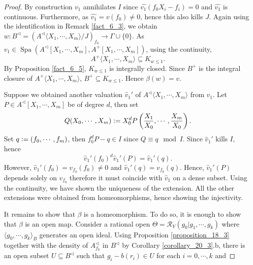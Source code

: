 \documentclass[10pt]{article}
\numberwithin{equation}{section}
\theoremstyle{definition}
\DeclareMathOperator{\Spa}{Spa}
\newcommand{\defeq}{\vcentcolon=}
\newcommand{\cR}[0]{\mathcal{R}}
\begin{document}
\begin{proof}
By construction $\widehat{v_1}$ annihilates $I$ since $\widehat{v_1}(f_0X_i-f_i) = 0$ and $\widehat{v_1}$ is continuous.
Furthermore, as $\widehat{v_1} = v(f_0) \not = 0$, hence this also kills $J$. Again using the identification in Remark \ref{fact_6_3}, we obtain $w:B^\triangleleft = (A^\triangleleft\langle X_1,\cdots,X_m\rangle/J)_{f_0}\to\Gamma\cup\{0\}$.
As $v_1\in\Spa(A^\triangleleft[X_1,\cdots,X_m],A^+[X_1,\cdots,X_m])$, using the continuity,
\begin{equation*}
    A^+\langle X_1,\cdots,X_m\rangle\subseteq K_{w\leq 1}.
\end{equation*}
By Proposition \ref{fact_6_5}, $K_{w\leq 1}$ is integrally closed. Since $B^+$ is the integral closure of $A^+\langle X_1,\cdots,X_m\rangle$, $B^+\subseteq K_{w\leq 1}$. Hence $\beta(w) = v$.
\par Suppose we obtained another valuation $\widehat{v}_1'$ of $A^\triangleleft\langle X_1,\cdots,X_m\rangle$ from $v_1$.
Let $P\in A^\triangleleft[X_1,\cdots,X_m]$ be of degree $d$, then set
\begin{equation*}
    Q(X_0,\cdots,X_m) \defeq X_0^dP\left({\frac {X_1} {X_0}},\cdots,{\frac {X_m} {X_0}}\right).
\end{equation*}
Set $q\defeq (f_0,\cdots,f_m)$, then $f_0^dP - q\in I$ since $Q \equiv q \mod{I}$. Since $\widehat{v}_1'$ kills $I$, hence
\begin{equation*}
    \widehat{v}_1'(f_0)^d\widehat{v}_1'(P) = \widehat{v}_1'(q).
\end{equation*}
However, $\widehat{v}_1'(f_0) = v_{f_0}(f_0)\not=0$ and $\widehat{v}_1'(q) = v_{f_0}(q)$. Hence, $\widehat{v}_1'(P)$ depends solely on $v_{f_0}$ therefore it must coincide with $\widehat{v}_1$ on a dense subset. Using the continuity, we have shown the uniqueness of the extension.
All the other extensions were obtained from homeomorphisms, hence showing the injectivity.
\par It remains to show that $\beta$ is a homeomorphism. To do so, it is enough to show that $\beta$ is an open map. Consider a rational open $\Theta=\cR_Y(g_0|g_1,\cdots,g_k)$ where $\langle g_0,\cdots,g_k\rangle_B$ generates an open ideal.
Using Proposition \ref{proposition_18_3} together with the density of $A_{f_0}^\triangleleft$ in $B^\triangleleft$ by Corollary \ref{corollary_20_3}.b, there is an open subset $U\subseteq B^\triangleleft$ such that $g_i-b(r_i)\in U$ for each $i=0,\cdots,k$ and

\end{proof}
\end{document}
